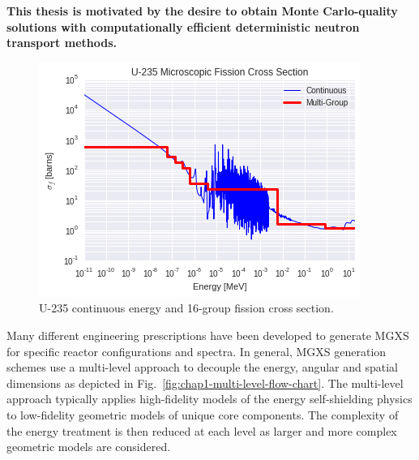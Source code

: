 \begin{emphbox}
\textbf{This thesis is motivated by the desire to obtain Monte Carlo-quality solutions with computationally efficient deterministic neutron transport methods.}
\end{emphbox}


\begin{figure}
\centering
\includegraphics[width=0.8\linewidth]{figures/intro/u235-ce-mg-xs}
\caption[U-235 continuous energy and multi-group fission cross section]{U-235 continuous energy and 16-group fission cross section.}
\label{fig:chap1-u235-sigf}
\end{figure}

Many different engineering prescriptions have been developed to generate \ac{MGXS} for specific reactor configurations and spectra. In general, \ac{MGXS} generation schemes use a multi-level approach to decouple the energy, angular and spatial dimensions as depicted in Fig.~\ref{fig:chap1-multi-level-flow-chart}. The multi-level approach typically applies high-fidelity models of the energy self-shielding physics to low-fidelity geometric models of unique core components. The complexity of the energy treatment is then reduced at each level as larger and more complex geometric models are considered.

